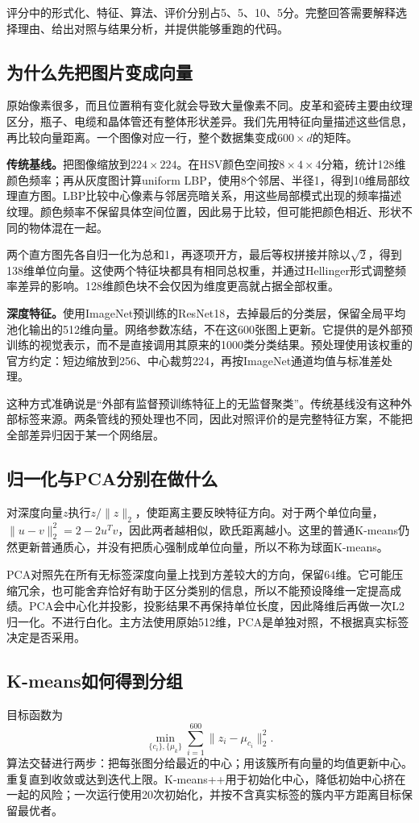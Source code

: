 \documentclass[UTF8,fontset=windows,11pt,a4paper]{ctexart}
\begin{document}
评分中的形式化、特征、算法、评价分别占5、5、10、5分。完整回答需要解释选择理由、给出对照与结果分析，并提供能够重跑的代码。

\subsection{为什么先把图片变成向量}
原始像素很多，而且位置稍有变化就会导致大量像素不同。皮革和瓷砖主要由纹理区分，瓶子、电缆和晶体管还有整体形状差异。我们先用特征向量描述这些信息，再比较向量距离。一个图像对应一行，整个数据集变成$600\times d$的矩阵。

\textbf{传统基线。}把图像缩放到$224\times224$。在HSV颜色空间按$8\times4\times4$分箱，统计128维颜色频率；再从灰度图计算uniform LBP，使用8个邻居、半径1，得到10维局部纹理直方图。LBP比较中心像素与邻居亮暗关系，用这些局部模式出现的频率描述纹理。颜色频率不保留具体空间位置，因此易于比较，但可能把颜色相近、形状不同的物体混在一起。

两个直方图先各自归一化为总和1，再逐项开方，最后等权拼接并除以$\sqrt2$，得到138维单位向量。这使两个特征块都具有相同总权重，并通过Hellinger形式调整频率差异的影响。128维颜色块不会仅因为维度更高就占据全部权重。

\textbf{深度特征。}使用ImageNet预训练的ResNet18，去掉最后的分类层，保留全局平均池化输出的512维向量。网络参数冻结，不在这600张图上更新。它提供的是外部预训练的视觉表示，而不是直接调用其原来的1000类分类结果。预处理使用该权重的官方约定：短边缩放到256、中心裁剪224，再按ImageNet通道均值与标准差处理。

这种方式准确说是“外部有监督预训练特征上的无监督聚类”。传统基线没有这种外部标签来源。两条管线的预处理也不同，因此对照评价的是完整特征方案，不能把全部差异归因于某一个网络层。

\subsection{归一化与PCA分别在做什么}
对深度向量$z$执行$z/\|z\|_2$，使距离主要反映特征方向。对于两个单位向量，$\|u-v\|_2^2=2-2u^Tv$，因此两者越相似，欧氏距离越小。这里的普通K-means仍然更新普通质心，并没有把质心强制成单位向量，所以不称为球面K-means。

PCA对照先在所有无标签深度向量上找到方差较大的方向，保留64维。它可能压缩冗余，也可能舍弃恰好有助于区分类别的信息，所以不能预设降维一定提高成绩。PCA会中心化并投影，投影结果不再保持单位长度，因此降维后再做一次L2归一化。不进行白化。主方法使用原始512维，PCA是单独对照，不根据真实标签决定是否采用。

\subsection{K-means如何得到分组}
目标函数为
\[
\min_{\{c_i\},\{\mu_k\}}\sum_{i=1}^{600}\|z_i-\mu_{c_i}\|_2^2.
\]
算法交替进行两步：把每张图分给最近的中心；用该簇所有向量的均值更新中心。重复直到收敛或达到迭代上限。K-means++用于初始化中心，降低初始中心挤在一起的风险；一次运行使用20次初始化，并按不含真实标签的簇内平方距离目标保留最优者。
\end{document}
